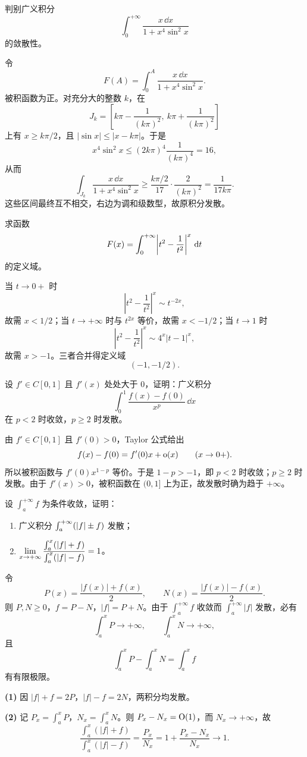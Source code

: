 \begin{xexercise}[5]
判别广义积分
  \[
    \int_0^{+\infty}\frac{x\,\dd x}{1+x^4\sin^2x}
  \]
  的敛散性。
\end{xexercise}
\begin{xsolution}
令
\[
  F(A)=\int_0^A\frac{x\,\dd x}{1+x^4\sin^2x}.
\]
被积函数为正。对充分大的整数 $k$，在
\[
  J_k=\left[k\pi-\frac1{(k\pi)^2},\ k\pi+\frac1{(k\pi)^2}\right]
\]
上有 $x\geq k\pi/2$，且 $|\sin x|\leq|x-k\pi|$。于是
\[
  x^4\sin^2x\leq (2k\pi)^4\frac1{(k\pi)^4}=16,
\]
从而
\[
  \int_{J_k}\frac{x\,\dd x}{1+x^4\sin^2x}
  \geq \frac{k\pi/2}{17}\cdot\frac{2}{(k\pi)^2}
  =\frac1{17k\pi}.
\]
这些区间最终互不相交，右边为调和级数型，故原积分发散。
\end{xsolution}


\begin{xexercise}[6]
求函数
  \[
    F(x)=\int_0^{+\infty}\abs*{t^2-\frac1{t^2}}^x\,\dd t
  \]
  的定义域。
\end{xexercise}
\begin{xsolution}
当 $t\to0+$ 时
\[
  \left|t^2-\frac1{t^2}\right|^x\sim t^{-2x},
\]
故需 $x<1/2$；当 $t\to+\infty$ 时与 $t^{2x}$ 等价，故需 $x<-1/2$；当 $t\to1$ 时
\[
  \left|t^2-\frac1{t^2}\right|^x\sim4^x|t-1|^x,
\]
故需 $x>-1$。三者合并得定义域
\[
  \boxed{(-1,-1/2)}.
\]
\end{xsolution}


\begin{xexercise}[7]
设 $f'\in C[0,1]$ 且 $f'(x)$ 处处大于 0，证明：广义积分
  \[
    \int_0^1\frac{f(x)-f(0)}{x^p}\,\dd x
  \]
  在 $p<2$ 时收敛，$p\geq2$ 时发散。
\end{xexercise}
\begin{xsolution}
由 $f'\in C[0,1]$ 且 $f'(0)>0$，Taylor 公式给出
\[
  f(x)-f(0)=f'(0)x+\mathrm{o}(x)\qquad(x\to0+).
\]
所以被积函数与 $f'(0)x^{1-p}$ 等价。于是 $1-p>-1$，即 $p<2$ 时收敛；$p\geq2$ 时发散。由于 $f'(x)>0$，被积函数在 $(0,1]$ 上为正，故发散时确为趋于 $+\infty$。
\end{xsolution}


\begin{xexercise}[8]
设 $\int_a^{+\infty}f$ 为条件收敛，证明：
  \begin{enumerate}[label=(\arabic*)]
    \item 广义积分 $\int_a^{+\infty}(\lvert f\rvert\pm f)$ 发散；
    \item $\displaystyle\lim_{x\to+\infty}\frac{\int_a^x(\lvert f\rvert+f)}{\int_a^x(\lvert f\rvert-f)}=1$。
  \end{enumerate}
\end{xexercise}
\begin{xsolution}
令
\[
  P(x)=\frac{|f(x)|+f(x)}2,\qquad N(x)=\frac{|f(x)|-f(x)}2.
\]
则 $P,N\geq0$，$f=P-N$，$|f|=P+N$。由于 $\int_a^{+\infty}f$ 收敛而 $\int_a^{+\infty}|f|$ 发散，必有
\[
  \int_a^xP\to+\infty,\qquad \int_a^xN\to+\infty,
\]
且
\[
  \int_a^xP-\int_a^xN=\int_a^x f
\]
有有限极限。

\textbf{(1)} 因 $|f|+f=2P$，$|f|-f=2N$，两积分均发散。

\textbf{(2)} 记 $P_x=\int_a^xP$，$N_x=\int_a^xN$。则 $P_x-N_x=\mathrm{O}(1)$，而 $N_x\to+\infty$，故
\[
  \frac{\int_a^x(|f|+f)}{\int_a^x(|f|-f)}
  =\frac{P_x}{N_x}=1+\frac{P_x-N_x}{N_x}\to1.
\]
\end{xsolution}


